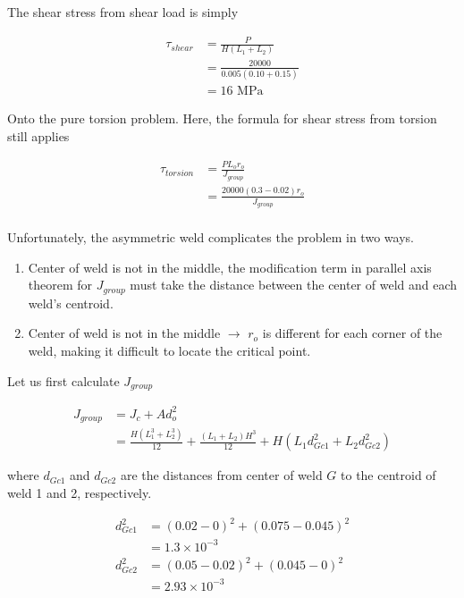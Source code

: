 \documentclass[a4paper,openany,nobib]{tufte-book}
\begin{document}
{{The shear stress from shear load is simply

$$\begin{aligned}
    \tau_{shear} &= \frac{P}{H(L_1 + L_2)} \\
                 &= \frac{20000}{0.005(0.10 + 0.15)} \\
                 &= 16 \text{ MPa}
  \end{aligned}$$

Onto the pure torsion problem. Here, the formula for shear stress from
torsion still applies

$$\begin{aligned}
    \tau_{torsion} &= \frac{P L_o r_o}{J_{group}} \\
                   &= \frac{20000(0.3 - 0.02)r_o}{J_{group}} \\
  \end{aligned}$$

Unfortunately, the asymmetric weld complicates the problem in two ways.

\begin{enumerate}
\item Center of weld is not in the middle, the modification term in
parallel axis theorem for \(J_{group}\) must take the distance between
the center of weld and each weld's centroid.

\item Center of weld is not in the middle \(\rightarrow\) \(r_o\) is different
for each corner of the weld, making it difficult to locate the
critical point.
\end{enumerate}

Let us first calculate \(J_{group}\)

$$\begin{aligned}
    J_{group} &= J_c + A d_o^2 \\
              &= \frac{H(L_1^3 + L_2^3)}{12} +\frac{(L_1 + L_2)H^3}{12} + H(L_1d_{Gc1}^2 + L_2d_{Gc2}^2)
  \end{aligned}$$

where \(d_{Gc1}\) and \(d_{Gc2}\) are the distances from center of weld \(G\)
to the centroid of weld 1 and 2, respectively.

$$\begin{aligned}
    d_{Gc1}^2 &= (0.02-0)^2+(0.075-0.045)^2 \\
              &= 1.3 \times 10^{-3} \\
    d_{Gc2}^2 &= (0.05-0.02)^2 + (0.045 - 0)^2 \\
              &= 2.93 \times 10^{-3}
  \end{aligned}$$

}}
\end{document}
